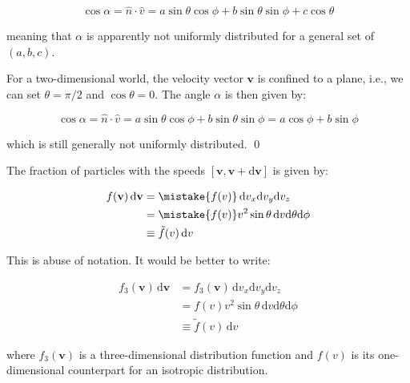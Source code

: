 \documentclass[12pt]{article}
\begin{document}
\begin{equation}
    \cos{\alpha} = \hat{n} \cdot \hat{v} = a \sin{\theta} \cos{\phi} + b \sin{\theta} \sin{\phi} + c \cos{\theta}
\end{equation}

meaning that $\alpha$ is apparently not uniformly distributed for a general set of $(a, b, c)$.

For a two-dimensional world, the velocity vector $\mathbf{v}$ is confined to a plane, i.e., we can set $\theta = \pi/2$ and $\cos{\theta} = 0$. The angle $\alpha$ is then given by:

\begin{equation}
    \cos{\alpha} = \hat{n} \cdot \hat{v} = a \sin{\theta} \cos{\phi} + b \sin{\theta} \sin{\phi} = a \cos{\phi} + b \sin{\phi}
\end{equation}

which is still generally not uniformly distributed.
\qed



The fraction of particles with the speeds $[\mathbf{v}, \mathbf{v} + \mathrm{d}\mathbf{v}]$ is given by:

\begin{equation}
    \begin{split}
        f(\mathbf{v}) \, \mathrm{d}\mathbf{v} &= \mistake{f(v)} \, \mathrm{d}v_{x} \mathrm{d}v_{y} \mathrm{d}v_{z} \\
        &= \mistake{f(v)} v^{2} \sin{\theta} \, \mathrm{d}v \mathrm{d}\theta \mathrm{d}\phi \\
        &\equiv \tilde{f}(v) \, \mathrm{d}v
    \end{split}
\end{equation}

\begin{correction}
    This is abuse of notation. It would be better to write:

    \begin{equation}
        \begin{split}
            f_{3}(\mathbf{v}) \, \mathrm{d}\mathbf{v} &= f_{3}(\mathbf{v}) \, \mathrm{d}v_{x} \mathrm{d}v_{y} \mathrm{d}v_{z} \\
            &= f(v) v^{2} \sin{\theta} \, \mathrm{d}v \mathrm{d}\theta \mathrm{d}\phi \\
            &\equiv \tilde{f}(v) \, \mathrm{d}v
        \end{split}
    \end{equation}

    where $f_{3}(\mathbf{v})$ is a three-dimensional distribution function and $f(v)$ is its one-dimensional counterpart for an isotropic distribution.
\end{correction}
\end{document}
